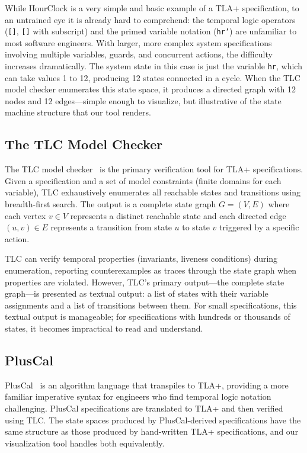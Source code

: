 \documentclass[conference]{IEEEtran}
\begin{document}
While HourClock is a very simple and basic example of a TLA+ specification, to an untrained eye it is already hard to comprehend: the temporal logic operators (\texttt{[]}, \texttt{[]} with subscript) and the primed variable notation (\texttt{hr'}) are unfamiliar to most software engineers. With larger, more complex system specifications involving multiple variables, guards, and concurrent actions, the difficulty increases dramatically. The system state in this case is just the variable \texttt{hr}, which can take values 1 to 12, producing 12 states connected in a cycle. When the TLC model checker enumerates this state space, it produces a directed graph with 12 nodes and 12 edges---simple enough to visualize, but illustrative of the state machine structure that our tool renders.

\subsection{The TLC Model Checker}

The TLC model checker~\cite{yuan1999model} is the primary verification tool for TLA+ specifications. Given a specification and a set of model constraints (finite domains for each variable), TLC exhaustively enumerates all reachable states and transitions using breadth-first search. The output is a complete state graph $G = (V, E)$ where each vertex $v \in V$ represents a distinct reachable state and each directed edge $(u, v) \in E$ represents a transition from state $u$ to state $v$ triggered by a specific action.

TLC can verify temporal properties (invariants, liveness conditions) during enumeration, reporting counterexamples as traces through the state graph when properties are violated. However, TLC's primary output---the complete state graph---is presented as textual output: a list of states with their variable assignments and a list of transitions between them. For small specifications, this textual output is manageable; for specifications with hundreds or thousands of states, it becomes impractical to read and understand.

\subsection{PlusCal}

PlusCal~\cite{lamport2009pluscal} is an algorithm language that transpiles to TLA+, providing a more familiar imperative syntax for engineers who find temporal logic notation challenging. PlusCal specifications are translated to TLA+ and then verified using TLC. The state spaces produced by PlusCal-derived specifications have the same structure as those produced by hand-written TLA+ specifications, and our visualization tool handles both equivalently.
\end{document}
